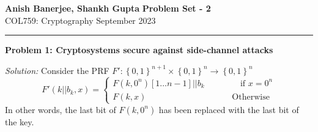 \documentclass[a4paper, 11pt]{article}
\newcommand{\hr}{\noindent\rule{7in}{2.8pt}}
\newenvironment{solution}
    {\textit{Solution:}}
    {\clearpage}
\newcommand{\prob}[1]{\begin{mdframed}[backgroundcolor=gray!20] \textbf{Problem #1}\end{mdframed}}
\newcommand{\bit}{\left\{0, 1\right\}}
\begin{document}
\noindent
\large\textbf{Anish Banerjee, Shankh Gupta} \hfill \textbf{Problem Set - 2}   \\
\normalsize COL759: Cryptography \hfill September 2023\\
\hr


\prob{1: Cryptosystems secure against side-channel attacks}
\begin{solution}
    Consider the PRF $F':\bit^{n+1}\times\bit^n\rightarrow\bit^n$
    $$F'(k||b_k,x)=
        \begin{cases}
            F(k,0^n)[1\dots n-1]||b_k \hspace{50pt} \text{if } x=0^n \\
            F(k,x) \hspace{120pt} \text{Otherwise}
        \end{cases}$$
    In other words, the last bit of $F(k,0^n)$ has been replaced with the last bit of the key.


\end{solution}
\end{document}
